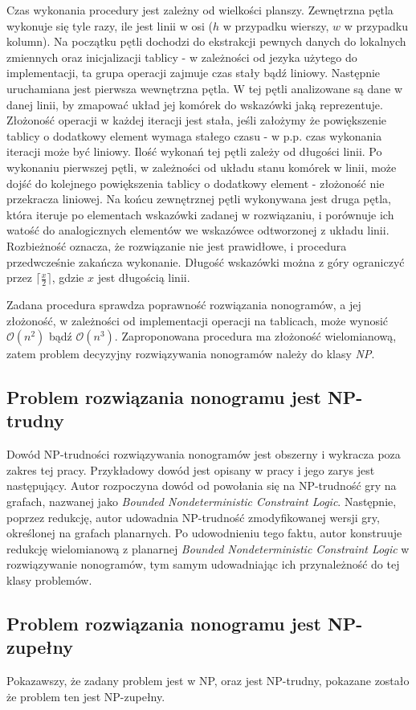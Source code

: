     Czas wykonania procedury jest zależny od wielkości planszy. Zewnętrzna pętla wykonuje się
tyle razy, ile jest linii w osi ($h$ w przypadku wierszy, $w$ w przypadku kolumn). Na początku pętli
dochodzi do ekstrakcji pewnych danych do lokalnych zmiennych oraz inicjalizacji tablicy - w zależności
od jezyka użytego do implementacji, ta grupa operacji zajmuje czas stały bądź liniowy. Następnie
uruchamiana jest pierwsza wewnętrzna pętla. W tej pętli analizowane są dane w danej linii, by zmapować
układ jej komórek do wskazówki jaką reprezentuje. Złożoność operacji w każdej iteracji jest stała,
jeśli założymy że powiększenie tablicy o dodatkowy element wymaga stałego czasu - w p.p. czas wykonania
iteracji może być liniowy. Ilość wykonań tej pętli zależy od długości linii.
Po wykonaniu pierwszej pętli, w zależności od układu stanu komórek w linii,
może dojść do kolejnego powiększenia tablicy o dodatkowy element - złożoność nie przekracza liniowej.
Na końcu zewnętrznej pętli wykonywana jest druga pętla, która iteruje po elementach wskazówki zadanej
w rozwiązaniu, i porównuje ich watość do analogicznych elementów we wskazówce odtworzonej z układu linii.
Rozbieżność oznacza, że rozwiązanie nie jest prawidłowe, i procedura przedwcześnie zakańcza wykonanie.
Długość wskazówki można z góry ograniczyć przez $\lceil \frac{x}{2} \rceil$, gdzie $x$ jest długością
linii.

    Zadana procedura sprawdza poprawność rozwiązania nonogramów, a jej złożoność, w zależności od
implementacji operacji na tablicach, może wynosić $\mathcal{O}(n^2)$ bądź $\mathcal{O}(n^3)$.
Zaproponowana procedura ma złożoność wielomianową, zatem problem decyzyjny rozwiązywania nonogramów
należy do klasy \textit{NP}.


\subsection{Problem rozwiązania nonogramu jest NP-trudny}
    Dowód NP-trudności rozwiązywania nonogramów jest obszerny i wykracza poza zakres tej pracy.
Przykładowy dowód jest opisany w pracy \cite{Nonograms-NP-Hard} i jego zarys jest następujący.
Autor rozpoczyna dowód od powołania się na NP-trudność gry na grafach, nazwanej jako
\textit{Bounded Nondeterministic Constraint Logic}. Następnie, poprzez redukcję, autor udowadnia 
NP-trudność zmodyfikowanej wersji gry, określonej na grafach planarnych. Po udowodnieniu tego faktu,
autor konstruuje redukcję wielomianową z planarnej \textit{Bounded Nondeterministic Constraint Logic}
w rozwiązywanie nonogramów, tym samym udowadniając ich przynależność do tej klasy problemów.


\subsection{Problem rozwiązania nonogramu jest NP-zupełny}
    Pokazawszy, że zadany problem jest w NP, oraz jest NP-trudny, pokazane zostało że problem ten
jest NP-zupełny.
